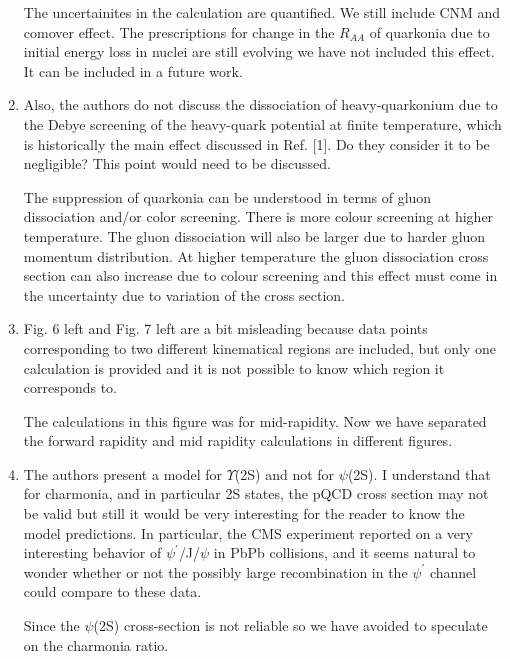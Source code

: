 \documentclass[aps,prc,preprint,superscriptaddress,showpacs,showkeys]{revtex4-1}
\begin{document}
\begin{enumerate}
{ \color{blue} 
  The uncertainites in the calculation are quantified. We still include CNM and comover effect.
  The prescriptions for change in the $R_{AA}$ of quarkonia due to initial energy loss in nuclei are 
still evolving we have not included this effect. It can be included in a future work. 
}


\item { \color{red} Also, the authors do not discuss the dissociation of
heavy-quarkonium due to the Debye screening of the heavy-quark
potential at finite temperature, which is historically the main effect
discussed in Ref. [1]. Do they consider it to be negligible? This
point would need to be discussed.}


{ \color{blue} The suppression of quarkonia can be understood in terms of 
gluon dissociation and/or color screening. 
  There is more colour screening at higher temperature. The gluon dissociation will also
be larger due to harder gluon momentum distribution.
  At higher temperature the gluon dissociation cross section can also increase due to colour 
screening and this effect must come in the uncertainty due to variation of the cross section.
}



\item { \color{red} Fig. 6 left and Fig. 7 left are a bit misleading because data points
corresponding to two different kinematical regions are included, but
only one calculation is provided and it is not possible to know which
region it corresponds to.}

{ \color{blue} 
  The calculations in this figure was for mid-rapidity. Now we have separated the forward 
rapidity and mid rapidity calculations in different figures.  
}

\item { \color{red} The authors present a model for $\Upsilon$(2S) and not for $\psi$(2S). 
I understand that for charmonia, and in particular 2S states, the pQCD
cross section may not be valid but still it would be very interesting
for the reader to know the model predictions. In particular, the CMS
experiment reported on a very interesting behavior of $\psi^{'}$/J/$\psi$ in
PbPb collisions, and it seems natural to wonder whether or not the
possibly large recombination in the $\psi^{'}$ channel could compare to
these data.}

{ \color{blue}   Since the $\psi$(2S) cross-section is not reliable so we have avoided to 
speculate on the charmonia ratio. }
\end{enumerate}
\end{document}
